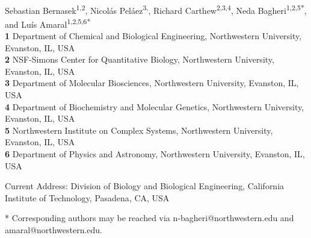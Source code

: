 \documentclass[10pt,letterpaper]{article}
\begin{document}
\vspace*{0.2in}

\begin{flushleft}
{\Large
\textbf{} %
}
\newline
\\
Sebastian Bernasek\textsuperscript{1,2},
Nicol\'as Pel\'aez\textsuperscript{3,\ddag},
Richard Carthew\textsuperscript{2,3,4},
Neda Bagheri\textsuperscript{1,2,5*}, and
Lu\'is Amaral\textsuperscript{1,2,5,6*}
\\
\bigskip
\textbf{1} Department of Chemical and Biological Engineering, Northwestern University, Evanston, IL, USA
\\
\textbf{2} NSF-Simons Center for Quantitative Biology, Northwestern University, Evanston, IL, USA
\\
\textbf{3} Department of Molecular Biosciences, Northwestern University, Evanston, IL, USA
\\
\textbf{4} Department of Biochemistry and Molecular Genetics, Northwestern University, Evanston, IL, USA
\\
\textbf{5} Northwestern Institute on Complex Systems, Northwestern University, Evanston, IL, USA
\\
\textbf{6} Department of Physics and Astronomy, Northwestern University, Evanston, IL, USA
\\
\bigskip

% 

\ddag Current Address: Division of Biology and Biological Engineering, California Institute of Technology, Pasadena, CA, USA %

* Corresponding authors may be reached via n-bagheri@northwestern.edu and amaral@northwestern.edu.


\end{flushleft}
\end{document}
